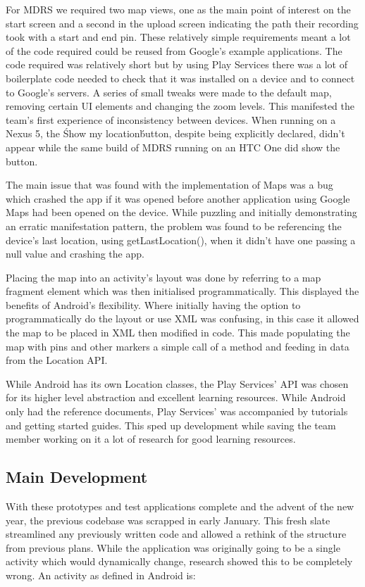 \documentclass{l3proj}
\begin{document}
For MDRS we required two map views, one as the main point of interest on the start screen and a second in the upload screen indicating the path their recording took with a start and end pin. These relatively simple requirements meant a lot of the code required could be reused from Google's example applications. The code required was relatively short but by using Play Services there was a lot of boilerplate code needed to check that it was installed on a device and to connect to Google's servers. A series of small tweaks were made to the default map, removing certain UI elements and changing the zoom levels. This manifested the team's first experience of inconsistency between devices. When running on a Nexus 5, the \'Show my location\' button, despite being explicitly declared, didn't appear while the same build of MDRS running on an HTC One did show the button.

The main issue that was found with the implementation of Maps was a bug which crashed the app if it was opened before another application using Google Maps had been opened on the device. While puzzling and initially demonstrating an erratic manifestation pattern, the problem was found to be referencing the device's last location, using getLastLocation(), when it didn't have one passing a null value and crashing the app.

Placing the map into an activity's layout was done by referring to a map fragment element which was then initialised programmatically. This displayed the benefits of Android's flexibility. Where initially having the option to programmatically do the layout or use XML was confusing, in this case it allowed the map to be placed in XML then modified in code. This made populating the map with pins and other markers a simple call of a method and feeding in data from the Location API.

While Android has its own Location classes, the Play Services' API was chosen for its higher level abstraction and excellent learning resources. While Android only had the reference documents, Play Services' was accompanied by tutorials and getting started guides. This sped up development while saving the team member working on it a lot of research for good learning resources.

\subsection{Main Development}
With these prototypes and test applications complete and the advent of the new year, the previous codebase was scrapped in early January. This fresh slate streamlined any previously written code and allowed a rethink of the structure from previous plans. While the application was originally going to be a single activity which would dynamically change, research showed this to be completely wrong. An activity as defined in Android is:
\end{document}
